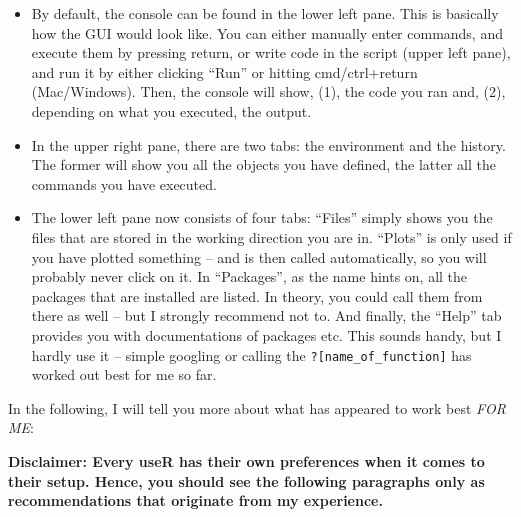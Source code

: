 \documentclass[
]{book}
\providecommand{\tightlist}{%
  \setlength{\itemsep}{0pt}\setlength{\parskip}{0pt}}
\begin{document}
\begin{itemize}
\tightlist
\item
  By default, the console can be found in the lower left pane. This is basically how the GUI would look like. You can either manually enter commands, and execute them by pressing return, or write code in the script (upper left pane), and run it by either clicking ``Run'' or hitting cmd/ctrl+return (Mac/Windows). Then, the console will show, (1), the code you ran and, (2), depending on what you executed, the output.\\
\item
  In the upper right pane, there are two tabs: the environment and the history. The former will show you all the objects you have defined, the latter all the commands you have executed.\\
\item
  The lower left pane now consists of four tabs: ``Files'' simply shows you the files that are stored in the working direction you are in. ``Plots'' is only used if you have plotted something -- and is then called automatically, so you will probably never click on it. In ``Packages'', as the name hints on, all the packages that are installed are listed. In theory, you could call them from there as well -- but I strongly recommend not to. And finally, the ``Help'' tab provides you with documentations of packages etc. This sounds handy, but I hardly use it -- simple googling or calling the \texttt{?{[}name\_of\_function{]}} has worked out best for me so far.
\end{itemize}

In the following, I will tell you more about what has appeared to work best \emph{FOR ME}:

\textbf{Disclaimer: Every useR has their own preferences when it comes to their setup. Hence, you should see the following paragraphs only as recommendations that originate from my experience.}
\end{document}
